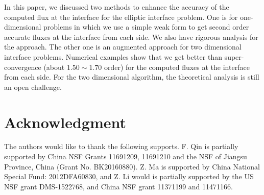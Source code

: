 \documentclass[11pt]{article}
\numberwithin{equation}{section}
\begin{document}
In this paper, we discussed two methods to enhance the accuracy of the computed flux
at the interface for the elliptic interface problem.
One is for one-dimensional problems
in which we use a simple weak form to get second order accurate fluxes at the interface from each side.
We also have rigorous analysis for the approach.
The other one is an augmented approach for two dimensional interface problems.
Numerical examples show that we get better than super-convergence (about $1.50\sim 1.70$ order)
for the computed fluxes at the interface from each side.
For the two dimensional algorithm, the theoretical analysis is still an open challenge.



\section*{Acknowledgment}
The authors would like to thank the following supports.
F. Qin is partially supported by China NSF Grants 11691209, 11691210
and the NSF of Jiangsu Province, China (Grant No. BK20160880).
Z. Ma is supported by China National Special Fund: 2012DFA60830,
and
Z. Li would is partially supported by the US NSF grant DMS-1522768, and China NSF grant 11371199 and 11471166.
\end{document}
